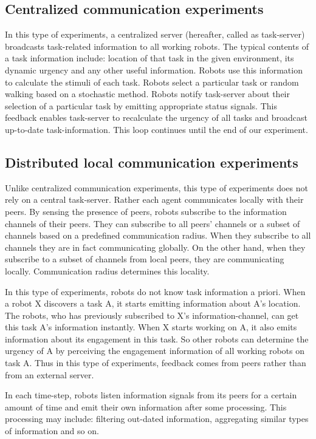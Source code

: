\documentclass{article}
\begin{document}
\subsection{Centralized communication experiments}
In this type of experiments, a centralized server  (hereafter, called as task-server) broadcasts  task-related information to all working robots. The typical contents of a task information include: location of that task in the given environment, its dynamic urgency and any other useful information. Robots use this information to  calculate the stimuli of each task. Robots select a particular task or random walking  based on a stochastic method. Robots notify task-server about their selection of a particular task by emitting appropriate status signals. This feedback enables task-server to recalculate  the urgency of all tasks and broadcast up-to-date task-information. This loop continues until the end of our experiment.
%
\subsection{Distributed local communication experiments}
Unlike centralized communication experiments, this type of experiments does not rely on a central task-server. Rather each agent communicates locally with their peers.  By sensing the presence of peers, robots subscribe to the information channels of their peers. They can subscribe to all peers' channels  or a subset of channels based on a predefined communication radius.  When they subscribe to all channels they are in fact communicating globally. On the other hand, when they subscribe to a subset of channels from local peers, they are communicating locally. Communication radius determines this locality. 

In this type of experiments, robots do not know task information a priori. When a robot X discovers a task A, it starts emitting information about A's location. The robots, who has previously subscribed to X's information-channel, can get this task A's information instantly. When X starts working on A, it also emits information about its engagement in this task. So other robots can determine the urgency of A by perceiving the engagement information of all working robots on task A. Thus in this type of experiments, feedback comes from peers rather than from an external server.

 In each time-step, robots listen information signals from its peers for a certain amount of time and emit their own information after some processing. This processing may include: filtering out-dated information, aggregating similar types of information and so on.
%
\end{document}
